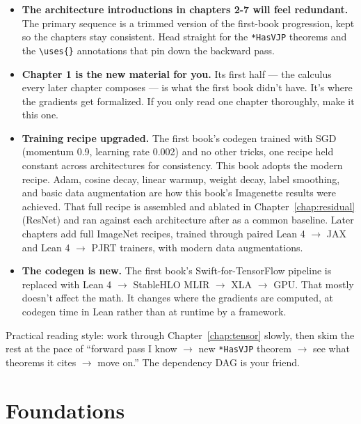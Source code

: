 \begin{itemize}
\item \textbf{The architecture introductions in chapters 2-7 will
  feel redundant.} The primary sequence is a trimmed version of the
  first-book progression, kept so the chapters stay consistent.
  Head straight for the \texttt{*HasVJP} theorems and the
  \texttt{\textbackslash uses\{\}} annotations that pin down the
  backward pass.

\item \textbf{Chapter 1 is the new material for you.} Its first
  half --- the calculus every later chapter composes --- is what the
  first book didn't have. It's where the gradients get formalized. If you only read one chapter
  thoroughly, make it this one.

\item \textbf{Training recipe upgraded.} The first book's codegen
  trained with SGD (momentum 0.9, learning rate 0.002) and no other
  tricks, one recipe held constant across architectures for
  consistency. This book adopts the modern recipe. Adam, cosine
  decay, linear warmup, weight decay, label smoothing, and basic
  data augmentation are how this book's Imagenette results were
  achieved. That full recipe is assembled and ablated in
  Chapter~\ref{chap:residual} (ResNet) and ran against each
  architecture after as a common baseline. Later chapters add full
  ImageNet recipes, trained through paired Lean 4 \(\to\) JAX and Lean 4
  \(\to\) PJRT trainers, with modern data augmentations.

\item \textbf{The codegen is new.} The first book's Swift-for-TensorFlow
  pipeline is replaced with Lean 4 \(\to\) StableHLO MLIR \(\to\) XLA
  \(\to\) GPU. That mostly doesn't affect the math. It changes where the
  gradients are computed, at codegen time in Lean rather than at runtime
  by a framework.
\end{itemize}

Practical reading style: work through Chapter~\ref{chap:tensor}
slowly, then skim the rest at the pace of ``forward pass I know
\(\to\) new \texttt{*HasVJP} theorem \(\to\) see what theorems it
cites \(\to\) move on.'' The dependency DAG is your friend.

\chapter*{Foundations}

